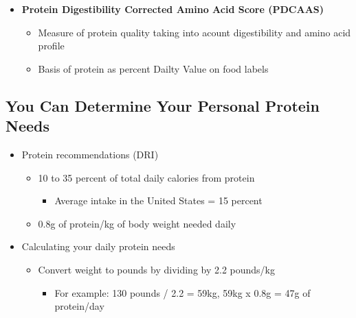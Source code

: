\documentclass[12pt]{article}
\begin{document}
\begin{itemize}
\begin{itemize}
\begin{itemize}
                            \end{itemize}
                    \end{itemize}
                \item \textbf{Protein Digestibility Corrected Amino Acid Score (PDCAAS)}
                    \begin{itemize}
                        \item Measure of protein quality taking into acount digestibility and amino acid profile
                        \item Basis of protein as percent Dailty Value on food labels
                    \end{itemize}
            \end{itemize}

        \subsection{You Can Determine Your Personal Protein Needs}
            \begin{itemize}
                \item Protein recommendations (DRI)
                    \begin{itemize}
                        \item 10 to 35 percent of total daily calories from protein
                            \begin{itemize}
                                \item Average intake in the United States = 15 percent
                            \end{itemize}
                        \item 0.8g of protein/kg of body weight needed daily
                    \end{itemize}
                \item Calculating your daily protein needs
                    \begin{itemize}
                        \item Convert weight to pounds by dividing by 2.2 pounds/kg
                            \begin{itemize}
                                \item For example: 130 pounds / 2.2 = 59kg, 59kg x 0.8g = 47g of protein/day
                            \end{itemize}
                    \end{itemize}
            \end{itemize}
\end{document}
